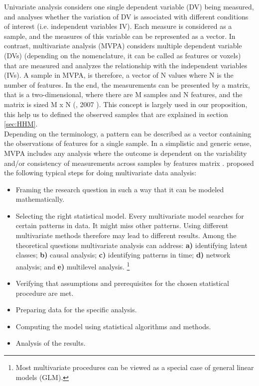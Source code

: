 Univariate analysis considers one single dependent variable (DV) being measured, and analyses whether the variation of DV is associated with different conditions of interest (i.e. independent variables IV). Each measure is considered as a sample, and the measures of this variable can be represented as a vector. In contrast, multivariate analysis (MVPA) considers multiple dependent variable (DVs) (depending on the nomenclature, it can be called as features or voxels) that are measured and analyzes the relationship with the independent variables (IVs). A sample in MVPA, is therefore, a vector of N values where N is the number of features. In the end, the measurements can be presented by a matrix, that is a two-dimensional, where there are M samples and N features, and the matrix is sized M x N (\citeauthor{baur2007multivariate}, 2007 \cite{baur2007multivariate}). This concept is largely used in our proposition, this help us to defined the observed samples that are explained in section \ref{sec:HHM}. \\  

Depending on the terminology, a pattern can be described as a vector containing the observations of features for a single sample. In a simplistic and generic sense, MVPA includes any analysis where the outcome is dependent on the variability and/or consistency of measurements across samples by features matrix \cite{baur2007multivariate}. \citeauthor{baur2007multivariate} proposed the following typical steps for doing multivariate data analysis:  

\begin{itemize}
\setlength\itemsep{0.1em}
\item[1.] Framing the research question in such a way that it can be modeled mathematically.
\item[2.] Selecting the right statistical model. Every multivariate model searches for certain patterns in 
data. It might miss other patterns. Using different multivariate methods therefore may lead to different results. Among the theoretical questions multivariate analysis can address: \textbf{a)} identifying latent classes; \textbf{b)} causal analysis; \textbf{c)} identifying patterns in time; \textbf{d)} network analysis; and \textbf{e)} multilevel analysis. \footnote{Most multivariate procedures can be viewed as a special case of general linear models (GLM).}
\item[3.] Verifying that assumptions and prerequisites for the chosen statistical procedure are met. 
\item[4.] Preparing data for the specific analysis.
\item[5.] Computing the model using statistical algorithms and methods.
\item[6.] Analysis of the results.
\end{itemize}
 
